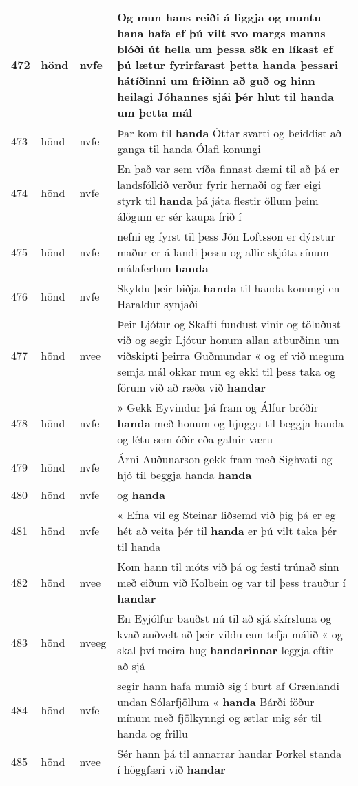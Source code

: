 \documentclass{article}
\begin{document}
\begin{longtable}{p{1cm}|p{1cm}|p{1cm}|p{13cm}}
\hline
472&hönd&nvfe&Og mun hans reiði á liggja og muntu hana hafa ef þú vilt svo margs manns blóði út hella um þessa sök en líkast ef þú lætur fyrirfarast þetta \textbf{handa} þessari hátíðinni um friðinn að guð og hinn heilagi Jóhannes sjái þér hlut til handa um þetta mál\\
\hline
473&hönd&nvfe&Þar kom til \textbf{handa} Óttar svarti og beiddist að ganga til handa Ólafi konungi\\
\hline
474&hönd&nvfe&En það var sem víða finnast dæmi til að þá er landsfólkið verður fyrir hernaði og fær eigi styrk til \textbf{handa} þá játa flestir öllum þeim álögum er sér kaupa frið í\\
\hline
475&hönd&nvfe&nefni eg fyrst til þess Jón Loftsson er dýrstur maður er á landi þessu og allir skjóta sínum málaferlum \textbf{handa} \\
\hline
476&hönd&nvfe&Skyldu þeir biðja \textbf{handa} til handa konungi en Haraldur synjaði\\
\hline
477&hönd&nvee&Þeir Ljótur og Skafti fundust vinir og töluðust við og segir Ljótur honum allan atburðinn um viðskipti þeirra Guðmundar « og ef við megum semja mál okkar mun eg ekki til þess taka og förum við að ræða við \textbf{handar} \\
\hline
478&hönd&nvfe&» Gekk Eyvindur þá fram og Álfur bróðir \textbf{handa} með honum og hjuggu til beggja handa og létu sem óðir eða galnir væru\\
\hline
479&hönd&nvfe&Árni Auðunarson gekk fram með Sighvati og hjó til beggja handa \textbf{handa} \\
\hline
480&hönd&nvfe&og \textbf{handa} \\
\hline
481&hönd&nvfe&« Efna vil eg Steinar liðsemd við þig þá er eg hét að veita þér til \textbf{handa} er þú vilt taka þér til handa\\
\hline
482&hönd&nvee&Kom hann til móts við þá og festi trúnað sinn með eiðum við Kolbein og var til þess trauður í \textbf{handar} \\
\hline
483&hönd&nveeg&En Eyjólfur bauðst nú til að sjá skírsluna og kvað auðvelt að þeir vildu enn tefja málið « og skal því meira hug \textbf{handarinnar} leggja eftir að sjá\\
\hline
484&hönd&nvfe&segir hann hafa numið sig í burt af Grænlandi undan Sólarfjöllum « \textbf{handa} Bárði föður mínum með fjölkynngi og ætlar mig sér til handa og frillu\\
\hline
485&hönd&nvee&Sér hann þá til annarrar handar Þorkel standa í höggfæri við \textbf{handar} \\

\end{longtable}
\end{document}
